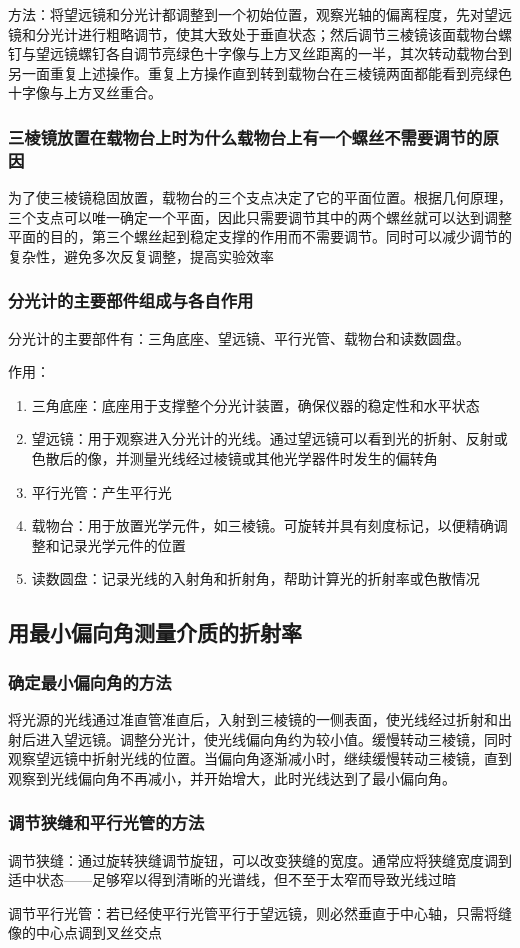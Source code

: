 \documentclass[UTF8]{ctexart}
\begin{document}
方法：将望远镜和分光计都调整到一个初始位置，观察光轴的偏离程度，先对望远镜和分光计进行粗略调节，使其大致处于垂直状态；然后调节三棱镜该面载物台螺钉与望远镜螺钉各自调节亮绿色十字像与上方叉丝距离的一半，其次转动载物台到另一面重复上述操作。重复上方操作直到转到载物台在三棱镜两面都能看到亮绿色十字像与上方叉丝重合。

\subsubsection{三棱镜放置在载物台上时为什么载物台上有一个螺丝不需要调节的原因}
为了使三棱镜稳固放置，载物台的三个支点决定了它的平面位置。根据几何原理，三个支点可以唯一确定一个平面，因此只需要调节其中的两个螺丝就可以达到调整平面的目的，第三个螺丝起到稳定支撑的作用而不需要调节。同时可以减少调节的复杂性，避免多次反复调整，提高实验效率
\subsubsection{分光计的主要部件组成与各自作用}
分光计的主要部件有：三角底座、望远镜、平行光管、载物台和读数圆盘。

作用：

\begin{enumerate}
    \item 三角底座：底座用于支撑整个分光计装置，确保仪器的稳定性和水平状态
    \item 望远镜：用于观察进入分光计的光线。通过望远镜可以看到光的折射、反射或色散后的像，并测量光线经过棱镜或其他光学器件时发生的偏转角
    \item 平行光管：产生平行光
    \item 载物台：用于放置光学元件，如三棱镜。可旋转并具有刻度标记，以便精确调整和记录光学元件的位置
    \item 读数圆盘：记录光线的入射角和折射角，帮助计算光的折射率或色散情况
\end{enumerate}
   


\subsection{用最小偏向角测量介质的折射率}

\subsubsection{确定最小偏向角的方法}
将光源的光线通过准直管准直后，入射到三棱镜的一侧表面，使光线经过折射和出射后进入望远镜。调整分光计，使光线偏向角约为较小值。缓慢转动三棱镜，同时观察望远镜中折射光线的位置。当偏向角逐渐减小时，继续缓慢转动三棱镜，直到观察到光线偏向角不再减小，并开始增大，此时光线达到了最小偏向角。

\subsubsection{调节狭缝和平行光管的方法}
调节狭缝：通过旋转狭缝调节旋钮，可以改变狭缝的宽度。通常应将狭缝宽度调到适中状态——足够窄以得到清晰的光谱线，但不至于太窄而导致光线过暗

调节平行光管：若已经使平行光管平行于望远镜，则必然垂直于中心轴，只需将缝像的中心点调到叉丝交点
\end{document}
